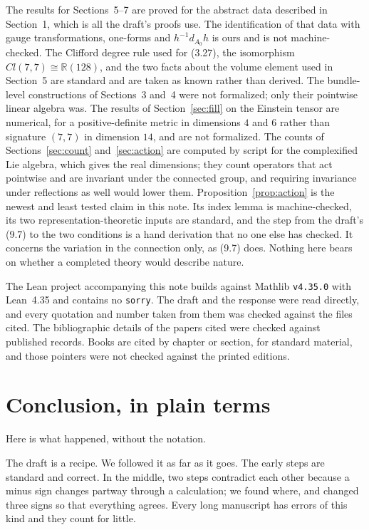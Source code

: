 \documentclass[11pt]{article}
\theoremstyle{remark}
\newcommand{\dA}{d_{A_0}}
\begin{document}
The results for Sections~5--7 are proved for the abstract data described in Section~1, which
is all the draft's proofs use. The identification of that data with gauge transformations,
one-forms and $h^{-1}\dA h$ is ours and is not machine-checked. The Clifford degree rule used
for (3.27), the isomorphism $Cl(7,7)\cong\mathbb R(128)$, and the two facts about the volume
element used in Section~5 are standard and are taken as known rather than derived. The
bundle-level constructions of Sections~3 and~4 were not formalized; only their pointwise
linear algebra was. The results of Section~\ref{sec:fill} on the Einstein tensor are numerical, for a
positive-definite metric in dimensions $4$ and $6$ rather than signature $(7,7)$ in dimension
$14$, and are not formalized. The counts of Sections~\ref{sec:count} and~\ref{sec:action} are
computed by script for the complexified Lie algebra, which gives the real dimensions; they
count operators that act pointwise and are invariant under the connected group, and requiring
invariance under reflections as well would lower them. Proposition~\ref{prop:action} is the
newest and least tested claim in this note. Its index lemma is machine-checked, its two
representation-theoretic inputs are standard, and the step from the draft's (9.7) to the two
conditions is a hand derivation that no one else has checked. It concerns the variation in
the connection only, as (9.7) does. Nothing here bears on whether a completed theory would
describe nature.

The Lean project accompanying this note builds against Mathlib \texttt{v4.35.0} with Lean~4.35
and contains no \texttt{sorry}. The draft \cite{GU} and the response \cite{NP} were read
directly, and every quotation and number taken from them was checked against the files cited.
The bibliographic details of the papers cited were checked against published records. Books are
cited by chapter or section, for standard material, and those pointers were not checked against
the printed editions.


\section{Conclusion, in plain terms}

Here is what happened, without the notation.

The draft is a recipe. We followed it as far as it goes. The early steps are standard and
correct. In the middle, two steps contradict each other because a minus sign changes partway
through a calculation; we found where, and changed three signs so that everything agrees.
Every long manuscript has errors of this kind and they count for little.
\end{document}
